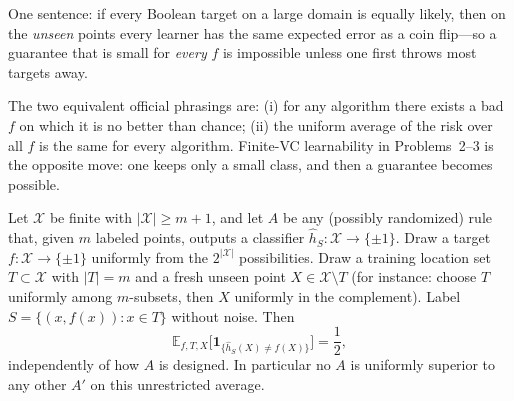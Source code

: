 One sentence: if every Boolean target on a large domain is equally likely, then on the \emph{unseen} points every learner has the same expected error as a coin flip---so a guarantee that is small for \emph{every} $f$ is impossible unless one first throws most targets away.

The two equivalent official phrasings are: (i) for any algorithm there exists a bad $f$ on which it is no better than chance; (ii) the uniform average of the risk over all $f$ is the same for every algorithm. Finite-VC learnability in Problems~2--3 is the opposite move: one keeps only a small class, and then a guarantee becomes possible.

\begin{theorem}
\label{thm:mlu-nfl}
Let $\mathcal{X}$ be finite with $\lvert\mathcal{X}\rvert\ge m+1$, and let $A$ be any (possibly randomized) rule that, given $m$ labeled points, outputs a classifier $\widehat h_S:\mathcal{X}\to\{\pm 1\}$. Draw a target $f:\mathcal{X}\to\{\pm 1\}$ uniformly from the $2^{\lvert\mathcal{X}\rvert}$ possibilities. Draw a training location set $T\subset\mathcal{X}$ with $\lvert T\rvert=m$ and a fresh unseen point $X\in\mathcal{X}\setminus T$ (for instance: choose $T$ uniformly among $m$-subsets, then $X$ uniformly in the complement). Label $S=\{(x,f(x)):x\in T\}$ without noise. Then
\[
\mathbb{E}_{f,T,X}\bigl[\mathbf{1}_{\{\widehat h_S(X)\ne f(X)\}}\bigr]
=
\frac12,
\]
independently of how $A$ is designed. In particular no $A$ is uniformly superior to any other $A'$ on this unrestricted average.
\end{theorem}

